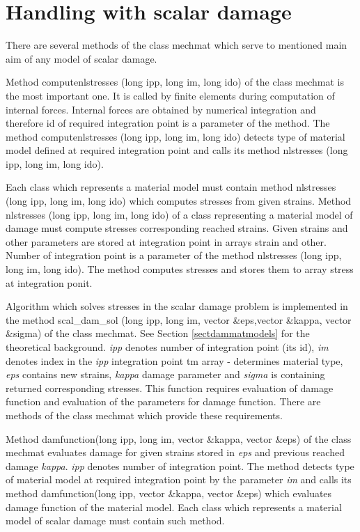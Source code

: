 \section{Handling with scalar damage}

There are several methods of the class {\sf mechmat} which serve to mentioned main aim of any model of scalar damage.

Method {\sf computenlstresses (long ipp, long im, long ido)} of the class {\sf mechmat} is the most important one.
It is called by finite elements during computation of internal forces. Internal forces are obtained by numerical
integration and therefore id of required integration point is a parameter of the method. The method
{\sf computenlstresses (long ipp, long im, long ido)} detects type of material model defined at required integration point and calls
its method {\sf nlstresses (long ipp, long im, long ido)}.

Each class which represents a material model must contain method {\sf nlstresses (long ipp, long im, long ido)} which computes
stresses from given strains.
Method {\sf nlstresses (long ipp, long im, long ido)} of a class representing a material model of damage must compute
stresses corresponding reached strains. Given strains and other parameters are stored at integration point in arrays
{\sf strain} and {\sf other}. Number of integration point is a parameter of the method {\sf nlstresses (long ipp, long im, long ido)}.
The method computes stresses and stores them to array {\sf stress} at integration ponit.

Algorithm which solves stresses in the scalar damage problem is implemented in the method {\sf scal\_dam\_sol (long ipp, long im, 
vector \&eps,vector \&kappa, vector \&sigma)} of the class {\sf mechmat}. See Section \ref{sectdammatmodels} for the
theoretical background.
{\it ipp} denotes number of integration point (its id), {\it im} denotes index in the {\it ipp} integration point {\sf tm} array - determines material type,
{\it eps} contains new strains, {\it kappa} damage parameter and {\it sigma} is containing returned corresponding stresses. This function requires
evaluation of damage function and evaluation of the parameters for damage function. There are methods of the class {\sf mechmat} which provide 
these requirements.


Method {\sf damfunction(long ipp, long im, vector \&kappa, vector \&eps)} of the class {\sf mechmat} evaluates
damage for given strains stored in {\it eps} and previous reached damage {\it kappa}. {\it ipp} denotes
number of integration point. The method detects type of material model at required integration point by the parameter {\it im} and
calls its method {\sf damfunction(long ipp, vector \&kappa, vector \&eps)} which evaluates damage function
of the material model. Each class which represents a material model of scalar damage must contain such method.

